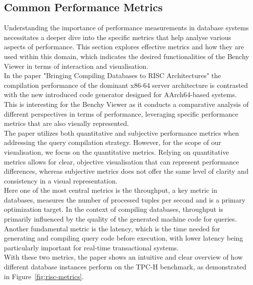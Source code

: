 \subsection{Common Performance Metrics}
Understanding the importance of performance measurements in database systems necessitates a deeper dive into the specific metrics that help analyse various aspects of performance. This section explores effective metrics and how they are used within this domain, which indicates the desired functionalities of the Benchy Viewer in terms of interaction and visualisation.\\
In the paper "Bringing Compiling Databases to RISC Architectures" \cite{Bringin-Compiling-Databases-to-RISC} the compilation performance of the dominant x86-64 server architecture is contrasted  with the new introduced code generator designed for AArch64-based systems. This is interesting for the Benchy Viewer as it conducts a comparative analysis of different perspectives in terms of performance,  leveraging specific performance metrics that are also visually represented.\\ 
The paper utilizes both quantitative and subjective performance metrics when addressing the query compilation strategy. However, for the scope of our visualisation, we focus on the quantitative metrics. Relying on quantitative metrics allows for clear, objective visualisation that can represent performance differences, whereas subjective metrics does not offer the same level of clarity and consistency in a visual representation.\\
Here one of the most central metrics is the throughput, a key metric in databases, measures the number of processed tuples per second and is a primary optimization target. In the context of compiling databases, throughput is primarily influenced by the quality of the generated machine code for queries.\\
Another fundamental metric is the latency, which is the time needed for generating and compiling query code before execution, with lower latency being particularly important for real-time transactional systems.\\
With these two metrics, the paper shows an intuitive and clear overview of how different database instances perform on the TPC-H benchmark, as demonstrated in Figure~\ref{fig:risc-metrics}.

